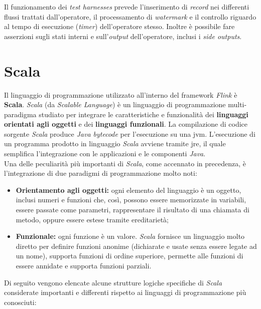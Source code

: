 Il funzionamento dei \textit{test harnesses} prevede l'inserimento di \textit{record} nei differenti flussi trattati dall'operatore, il processamento di \textit{watermark} e il controllo riguardo al tempo di esecuzione (\textit{timer}) dell'operatore stesso. Inoltre è possibile fare asserzioni sugli stati interni e sull'\textit{output} dell'operatore, inclusi i \textit{side outputs}. 



\section{Scala}\label{sec:scala}
Il linguaggio di programmazione utilizzato all'interno del \gls{framework} \textit{Flink} è \textbf{Scala}. \textit{Scala} (da \textit{Scalable Language}) è un linguaggio di programmazione multi-paradigma studiato per integrare le caratteristiche e funzionalità dei \textbf{linguaggi orientati agli oggetti} e dei \textbf{linguaggi funzionali}. La compilazione di codice sorgente \textit{Scala} produce \textit{Java bytecode} per l'esecuzione su una \gls{jvm}. L'esecuzione di un programma prodotto in linguaggio \textit{Scala} avviene tramite \gls{jre}, il quale semplifica l'integrazione con le applicazioni e le componenti \textit{Java}.\\
Una delle peculiarità più importanti di \textit{Scala}, come accennato in precedenza, è l'integrazione di due paradigmi di programmazione molto noti:
\begin{itemize}
	\item{\textbf{Orientamento agli oggetti:} ogni elemento del linguaggio è un oggetto, inclusi numeri e funzioni che, così, possono essere memorizzate in variabili, essere passate come parametri, rappresentare il risultato di una chiamata di metodo, oppure essere estese tramite ereditarietà;}
	\item{\textbf{Funzionale:} ogni funzione è un valore. \textit{Scala} fornisce un linguaggio molto diretto per definire funzioni anonime (dichiarate e usate senza essere legate ad un nome), supporta funzioni di ordine superiore, permette alle funzioni di essere annidate e supporta funzioni parziali.}
\end{itemize}
Di seguito vengono elencate alcune strutture logiche specifiche di \textit{Scala} considerate importanti e differenti rispetto ai linguaggi di programmazione più conosciuti:
